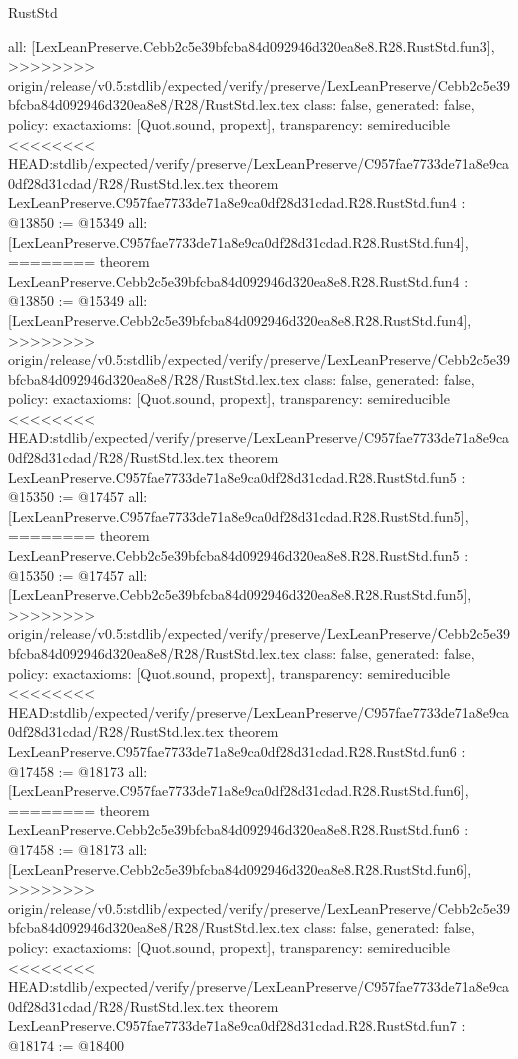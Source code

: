 \begin{lexlean}{RustStd}
\begin{coremodule}
{\begin{coremodule}
{{{{{{{  all: [LexLeanPreserve.Cebb2c5e39bfcba84d092946d320ea8e8.R28.RustStd.fun3],
>>>>>>>> origin/release/v0.5:stdlib/expected/verify/preserve/LexLeanPreserve/Cebb2c5e39bfcba84d092946d320ea8e8/R28/RustStd.lex.tex
  class: false,
  generated: false,
  policy: exact{axioms: [Quot.sound, propext]},
  transparency: semireducible
}
<<<<<<<< HEAD:stdlib/expected/verify/preserve/LexLeanPreserve/C957fae7733de71a8e9ca0df28d31cdad/R28/RustStd.lex.tex
theorem LexLeanPreserve.C957fae7733de71a8e9ca0df28d31cdad.R28.RustStd.fun4 : @13850 := @15349 {
  all: [LexLeanPreserve.C957fae7733de71a8e9ca0df28d31cdad.R28.RustStd.fun4],
========
theorem LexLeanPreserve.Cebb2c5e39bfcba84d092946d320ea8e8.R28.RustStd.fun4 : @13850 := @15349 {
  all: [LexLeanPreserve.Cebb2c5e39bfcba84d092946d320ea8e8.R28.RustStd.fun4],
>>>>>>>> origin/release/v0.5:stdlib/expected/verify/preserve/LexLeanPreserve/Cebb2c5e39bfcba84d092946d320ea8e8/R28/RustStd.lex.tex
  class: false,
  generated: false,
  policy: exact{axioms: [Quot.sound, propext]},
  transparency: semireducible
}
<<<<<<<< HEAD:stdlib/expected/verify/preserve/LexLeanPreserve/C957fae7733de71a8e9ca0df28d31cdad/R28/RustStd.lex.tex
theorem LexLeanPreserve.C957fae7733de71a8e9ca0df28d31cdad.R28.RustStd.fun5 : @15350 := @17457 {
  all: [LexLeanPreserve.C957fae7733de71a8e9ca0df28d31cdad.R28.RustStd.fun5],
========
theorem LexLeanPreserve.Cebb2c5e39bfcba84d092946d320ea8e8.R28.RustStd.fun5 : @15350 := @17457 {
  all: [LexLeanPreserve.Cebb2c5e39bfcba84d092946d320ea8e8.R28.RustStd.fun5],
>>>>>>>> origin/release/v0.5:stdlib/expected/verify/preserve/LexLeanPreserve/Cebb2c5e39bfcba84d092946d320ea8e8/R28/RustStd.lex.tex
  class: false,
  generated: false,
  policy: exact{axioms: [Quot.sound, propext]},
  transparency: semireducible
}
<<<<<<<< HEAD:stdlib/expected/verify/preserve/LexLeanPreserve/C957fae7733de71a8e9ca0df28d31cdad/R28/RustStd.lex.tex
theorem LexLeanPreserve.C957fae7733de71a8e9ca0df28d31cdad.R28.RustStd.fun6 : @17458 := @18173 {
  all: [LexLeanPreserve.C957fae7733de71a8e9ca0df28d31cdad.R28.RustStd.fun6],
========
theorem LexLeanPreserve.Cebb2c5e39bfcba84d092946d320ea8e8.R28.RustStd.fun6 : @17458 := @18173 {
  all: [LexLeanPreserve.Cebb2c5e39bfcba84d092946d320ea8e8.R28.RustStd.fun6],
>>>>>>>> origin/release/v0.5:stdlib/expected/verify/preserve/LexLeanPreserve/Cebb2c5e39bfcba84d092946d320ea8e8/R28/RustStd.lex.tex
  class: false,
  generated: false,
  policy: exact{axioms: [Quot.sound, propext]},
  transparency: semireducible
}
<<<<<<<< HEAD:stdlib/expected/verify/preserve/LexLeanPreserve/C957fae7733de71a8e9ca0df28d31cdad/R28/RustStd.lex.tex
theorem LexLeanPreserve.C957fae7733de71a8e9ca0df28d31cdad.R28.RustStd.fun7 : @18174 := @18400 {
}}}}}}}}}}
\end{coremodule}}
\end{coremodule}
\end{lexlean}
